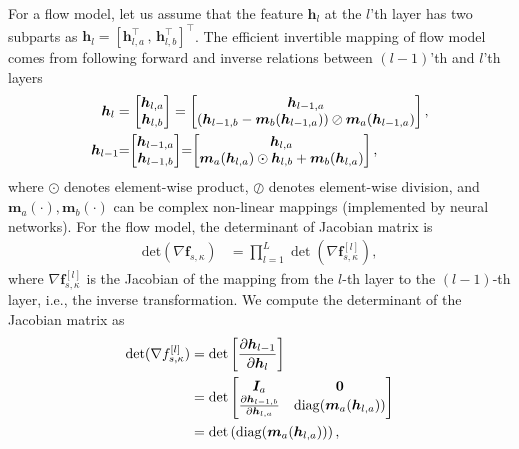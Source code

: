 \documentclass[letterpaper]{article} %
\begin{document}
For a flow model, let us assume that
the feature $\bm{h}_l$ at the $l$'th layer has two subparts as
$\bm{h}_l = [\bm{h}_{l,a}^{\intercal} \, , \, \bm{h}_{l,b}^{\intercal}]^{\intercal}$. The efficient invertible mapping of flow model comes from following forward and inverse relations between $(l-1)$'th and $l$'th layers
\begin{align}\label{eq-gl}
    \bm{h}_{l} &=
    \begin{bmatrix}
      \bm{h}_{l,a}\\
      \bm{h}_{l,b}
    \end{bmatrix}
    =
    \begin{bmatrix}
      \bm{h}_{l-1,a}\\
      \left(  \bm{h}_{l-1,b} - \bm{m}_b(\bm{h}_{l-1,a}) \right)\oslash \bm{m}_a(\bm{h}_{l-1,a}) 
    \end{bmatrix}, \nonumber\\
        \bm{h}_{l-1} \hspace{-0.1cm}&=\hspace{-0.1cm}
    \begin{bmatrix}
      \bm{h}_{l-1,a}\\
      \bm{h}_{l-1,b}
    \end{bmatrix}
    \hspace{-0.1cm}=\hspace{-0.1cm}
    \begin{bmatrix}
      \bm{h}_{l,a}\\
      \bm{m}_a(\bm{h}_{l,a})\odot \bm{h}_{l,b} + \bm{m}_b(\bm{h}_{l,a})
    \end{bmatrix},
\end{align}
where $\odot$ denotes element-wise product, $\oslash$ denotes
element-wise division, and $\bm{m}_a(\cdot), \bm{m}_b(\cdot)$ can be
complex non-linear mappings (implemented by neural networks).
For the flow model, the determinant of Jacobian matrix is
\begin{equation}\label{eq:cat-jacobian}
  \begin{array}{rl}
    \mathrm{det}(\nabla{\bm{f}_{s,\kappa}}) & = \prod_{l=1}^L \det (\nabla{\bm{f}_{s,\kappa}^{[l]}}),
  \end{array}
\end{equation}
where $\nabla{\bm{f}_{s,\kappa}^{[l]}}$ is the Jacobian of the mapping from the $l$-th layer to the $(l-1)$-th layer, i.e., the inverse transformation. We compute the determinant of the Jacobian matrix as
\begin{align}\label{eq-hl-determinate}
  \det (\nabla{f_{s,\kappa}^{[l]}})& = \det \left[  \frac{ \partial \bm{h}_{l-1}}{\partial \bm{h}_l} \right] \nonumber\\
                                   & = \det
                                     \begin{bmatrix}
                                       \bm{I}_a & \mathbf{0} \nonumber\\
                                       \frac{ \partial \bm{h}_{l-1,b}}{\partial \bm{h}_{l,a}} & \mathrm{diag}(\bm{m}_a(\bm{h}_{l,a}))
                                     \end{bmatrix}\nonumber\\
                                   &= \det \left( \mathrm{diag}(\bm{m}_a(\bm{h}_{l,a})) \right),
\end{align}
\end{document}
